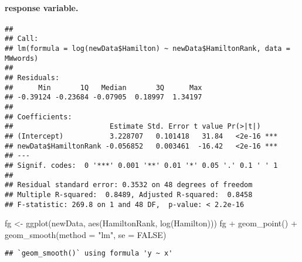 \documentclass[
]{article}
\newenvironment{Shaded}{\begin{snugshade}}{\end{snugshade}}
\newcommand{\AttributeTok}[1]{\textcolor[rgb]{0.77,0.63,0.00}{#1}}
\newcommand{\ConstantTok}[1]{\textcolor[rgb]{0.00,0.00,0.00}{#1}}
\newcommand{\FunctionTok}[1]{\textcolor[rgb]{0.00,0.00,0.00}{#1}}
\newcommand{\NormalTok}[1]{#1}
\newcommand{\OtherTok}[1]{\textcolor[rgb]{0.56,0.35,0.01}{#1}}
\newcommand{\SpecialCharTok}[1]{\textcolor[rgb]{0.00,0.00,0.00}{#1}}
\newcommand{\StringTok}[1]{\textcolor[rgb]{0.31,0.60,0.02}{#1}}
\begin{document}
\hypertarget{response-variable.}{%
\paragraph{response variable.}\label{response-variable.}}

\begin{Shaded}
\end{Shaded}

\begin{verbatim}
## 
## Call:
## lm(formula = log(newData$Hamilton) ~ newData$HamiltonRank, data = MWwords)
## 
## Residuals:
##      Min       1Q   Median       3Q      Max 
## -0.39124 -0.23684 -0.07905  0.18997  1.34197 
## 
## Coefficients:
##                       Estimate Std. Error t value Pr(>|t|)    
## (Intercept)           3.228707   0.101418   31.84   <2e-16 ***
## newData$HamiltonRank -0.056852   0.003461  -16.42   <2e-16 ***
## ---
## Signif. codes:  0 '***' 0.001 '**' 0.01 '*' 0.05 '.' 0.1 ' ' 1
## 
## Residual standard error: 0.3532 on 48 degrees of freedom
## Multiple R-squared:  0.8489, Adjusted R-squared:  0.8458 
## F-statistic: 269.8 on 1 and 48 DF,  p-value: < 2.2e-16
\end{verbatim}

\begin{Shaded}
\begin{Highlighting}[]
\NormalTok{fg }\OtherTok{\textless{}{-}} \FunctionTok{ggplot}\NormalTok{(newData, }\FunctionTok{aes}\NormalTok{(HamiltonRank, }\FunctionTok{log}\NormalTok{(Hamilton))) }
\NormalTok{fg }\SpecialCharTok{+} \FunctionTok{geom\_point}\NormalTok{() }\SpecialCharTok{+} \FunctionTok{geom\_smooth}\NormalTok{(}\AttributeTok{method =} \StringTok{"lm"}\NormalTok{, }\AttributeTok{se =} \ConstantTok{FALSE}\NormalTok{)}
\end{Highlighting}
\end{Shaded}

\begin{verbatim}
## `geom_smooth()` using formula 'y ~ x'
\end{verbatim}
\end{document}
